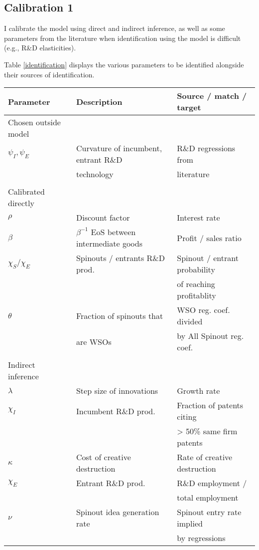 \documentclass[11pt,english]{article}
\theoremstyle{remark}
\begin{document}
\subsection{Calibration 1}

I calibrate the model using direct and indirect inference, as well as some parameters from the literature when identification using the model is difficult (e.g., R\&D elasticities). 

Table \ref{identification} displays the various parameters to be identified alongside their sources of identification. 

\begin{center}
	\footnotesize
	\begin{tabular}{lll}
		\hline 
		Parameter &  Description & Source / match / target \\
		\hline 
		Chosen outside model & \\
		$\psi_I, \psi_E$ & Curvature of incumbent, entrant R\&D & R\&D regressions from \\
		& technology & literature\\
		& & \\
		Calibrated directly &  \\
		$\rho$ & Discount factor & Interest rate \\
		$\beta$ & $\beta^{-1}$ EoS between intermediate goods & Profit / sales ratio \\
		$\chi_S / \chi_E$ & Spinouts / entrants R\&D prod. & Spinout / entrant probability \\
		& & of reaching profitablity \\
		$\theta$ & Fraction of spinouts that & WSO reg. coef. divided \\
		& are WSOs & by All Spinout reg. coef. \\
		& \\
		Indirect inference & \\
		$\lambda$ & Step size of innovations & Growth rate \\
		$\chi_I$ & Incumbent R\&D prod. & Fraction of patents citing \\
		& & > 50\% same firm patents \\
		$\kappa$ & Cost of creative destruction & Rate of creative destruction \\
		$\chi_E$ & Entrant R\&D prod. & R\&D employment / \\
		& & total employment \\
		$\nu$ & Spinout idea generation rate & Spinout entry rate implied \\
		& & by regressions \\
		\hline
	\end{tabular}
	\label{identification}
\end{center}
\end{document}
